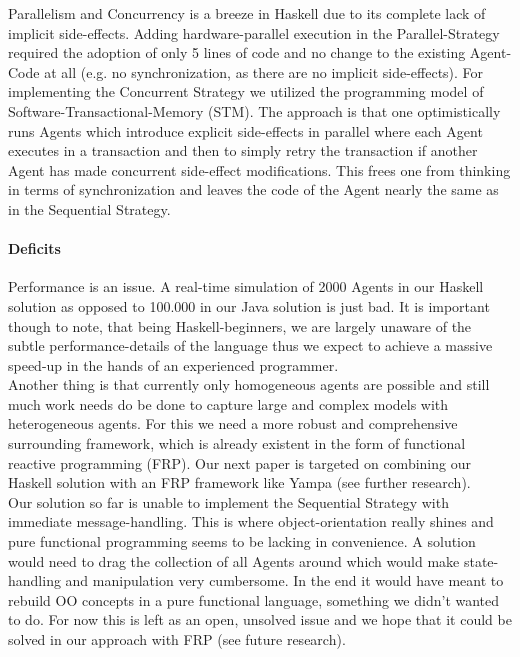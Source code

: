 Parallelism and Concurrency is a breeze in Haskell due to its complete lack of implicit side-effects. Adding hardware-parallel execution in the Parallel-Strategy required the adoption of only 5 lines of code and no change to the existing Agent-Code at all (e.g. no synchronization, as there are no implicit side-effects). For implementing the Concurrent Strategy we utilized the programming model of Software-Transactional-Memory (STM). The approach is that one optimistically runs Agents which introduce explicit side-effects in parallel where each Agent executes in a transaction and then to simply retry the transaction if another Agent has made concurrent side-effect modifications. This frees one from thinking in terms of synchronization and leaves the code of the Agent nearly the same as in the Sequential Strategy.

\paragraph{Deficits}
Performance is an issue. A real-time simulation of 2000 Agents in our Haskell solution as opposed to 100.000 in our Java solution is just bad. It is important though to note, that being Haskell-beginners, we are largely unaware of the subtle performance-details of the language thus we expect to achieve a massive speed-up in the hands of an experienced programmer. \\

Another thing is that currently only homogeneous agents are possible and still much work needs do be done to capture large and complex models with heterogeneous agents. For this we need a more robust and comprehensive surrounding framework, which is already existent in the form of functional reactive programming (FRP). Our next paper is targeted on combining our Haskell solution with an FRP framework like Yampa (see further research). \\ 

Our solution so far is unable to implement the Sequential Strategy with immediate message-handling. This is where object-orientation really shines and pure functional programming seems to be lacking in convenience. A solution would need to drag the collection of all Agents around which would make state-handling and manipulation very cumbersome. In the end it would have meant to rebuild OO concepts in a pure functional language, something we didn't wanted to do. For now this is left as an open, unsolved issue and we hope that it could be solved in our approach with FRP (see future research).

